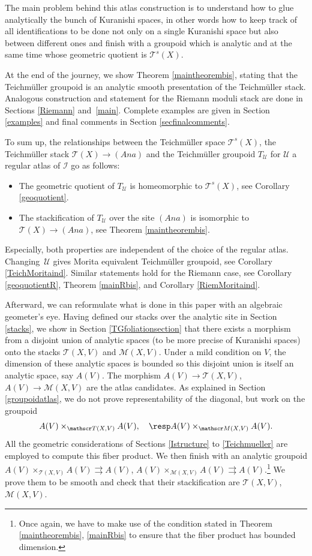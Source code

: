 \documentclass[JEP,XML,SOM,Unicode]{cedram}
\let\mathcal\mathscr
\newcommand{\Ana}{\mathit{Ana}}
\theoremstyle{plain}
\theoremstyle{definition}
\theoremstyle{remark}
\numberwithin{equation}{section}
\newcommand{\cI}{\mathcal{I}}
\begin{document}
The main problem behind this atlas construction is to understand how to glue analytically the bunch of Kuranishi spaces, in other words how to keep track of all identifications to be done not only on a single Kuranishi space but also between different ones and finish with a groupoid which is analytic and at the same time whose geometric quotient is $\mathcal T^s(X)$.

At the end of the journey, we show Theorem \ref{maintheorembis}, stating that the Teichmüller groupoid is an analytic smooth presentation of the Teichmüller stack. Analogous construction and statement for the Riemann moduli stack are done in Sections \ref{Riemann} and~\ref{main}. Complete examples are given in Section \ref{examples} and final comments in Section \ref{secfinalcomments}.

To sum up, the relationships between the Teichmüller space $\mathcal T^s(X)$, the Teichmüller stack $\mathcal T(X)\to (\Ana)$ and the Teichmüller groupoid $T_{\mathcal U}$ for $\mathcal U$ a regular atlas of $\cI$ go as follows:\vspace*{-3pt}
\begin{itemize}
\item The geometric quotient of $T_\mathcal U$ is homeomorphic to $\mathcal T^s(X)$, see Corollary \ref{geoquotient}.
\item The stackification of $T_\mathcal U$ over the site $(\Ana)$ is isomorphic to $\mathcal T(X)\to (\Ana)$, see Theorem \ref{maintheorembis}.
\end{itemize}
Especially, both properties are independent of the choice of the regular atlas. \hbox{Changing}~$\mathcal U$ gives Morita equivalent Teichmüller groupoid, see Corollary \ref{TeichMoritaind}. Similar statements hold for the Riemann case, see Corollary \ref{geoquotientR}, Theorem \ref{mainRbis}, and Corollary \ref{RiemMoritaind}.

Afterward, we can reformulate what is done in this paper with an algebraic geometer's eye. Having defined our stacks over the analytic site in Section \ref{stacks}, we show in Section \ref{TGfoliationsection} that there exists a morphism from a disjoint union of analytic spaces (to be more precise of Kuranishi spaces) onto the stacks $\mathcal T(X,V)$ and $\mathcal{M}(X,V)$. Under a mild condition on $V$, the dimension of these analytic spaces is bounded so this disjoint union is itself an analytic space, say $A(V)$. The morphism $A(V)\to \mathcal T(X,V)$, \resp $A(V)\to \mathcal M(X,V)$ are the atlas candidates. As explained in Section \ref{groupoidatlas}, we do not prove representability of the diagonal, but work on the groupoid
\[
A(V)\times_{\mathcal T(X,V)}A(V),\quad \resp A(V)\times_{\mathcal M(X,V)}A(V).
\]
All the geometric considerations of Sections \ref{Istructure} to \ref{Teichmueller} are employed to compute this fiber product. We then finish with an analytic groupoid $A(V)\times_{\mathcal T(X,V)}A(V)\rightrightarrows A(V)$, \resp $A(V)\times_{\mathcal M(X,V)}A(V)\rightrightarrows A(V)$.\footnote{Once again, we have to make use of the condition stated in Theorem \ref{maintheorembis}, \resp \ref{mainRbis} to ensure that the fiber product has bounded dimension.} We prove them to be smooth and check that their stackification are $\mathcal T(X,V)$, \resp $\mathcal M(X,V)$.
\end{document}
